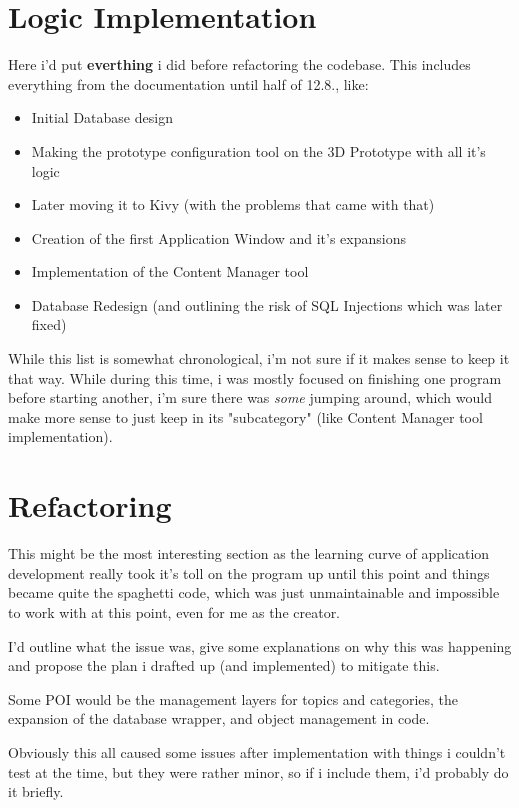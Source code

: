\section{Logic Implementation}
Here i'd put \textbf{everthing} i did before refactoring the codebase. This includes everything from the documentation until half of 12.8., like:
\begin{itemize}
	\item Initial Database design
	\item Making the prototype configuration tool on the 3D Prototype with all it's logic 
	\item Later moving it to Kivy (with the problems that came with that)
	\item Creation of the first Application Window and it's expansions
	\item Implementation of the Content Manager tool
	\item Database Redesign (and outlining the risk of SQL Injections which was later fixed)
\end{itemize}

While this list is somewhat chronological, i'm not sure if it makes sense to keep it that way. While during this time, i was mostly focused on finishing one program before starting another, i'm sure there was \textit{some} jumping around, which would make more sense to just keep in its "subcategory" (like Content Manager tool implementation).

\section{Refactoring}

This might be the most interesting section as the learning curve of application development really took it's toll on the program up until this point and things became quite the spaghetti code, which was just unmaintainable and impossible to work with at this point, even for me as the creator.

I'd outline what the issue was, give some explanations on why this was happening and propose the plan i drafted up (and implemented) to mitigate this.

Some POI would be the management layers for topics and categories, the expansion of the database wrapper, and object management in code.

Obviously this all caused some issues after implementation with things i couldn't test at the time, but they were rather minor, so if i include them, i'd probably do it briefly.

